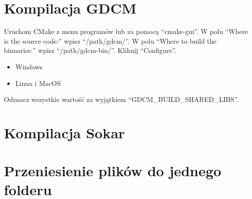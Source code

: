\section{Kompilacja GDCM}

Uruchom CMake z menu programów lub za pomocą \enquote{cmake-gui}.
W polu \enquote{Where is the source code:} wpisz \enquote{/path/gdcm/}.
W polu \enquote{Where to build the binnaries:} wpisz \enquote{/path/gdcm-bin/}.
Kliknij \enquote{Configure}.
\begin{itemize}
    \item Windows
    \item Linux i MacOS
\end{itemize}
Odznacz wszystkie wartość za wyjątkiem \enquote{GDCM\_BUILD\_SHARED\_LIBS}.

\section{Kompilacja Sokar}

\section{Przeniesienie plików do jednego folderu}
